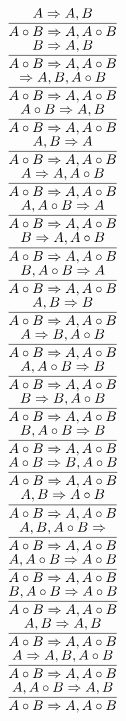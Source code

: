 \documentclass[11pt]{article}
\begin{document}
\begin{center}
\bigskip
\\$\infer{A\circ B\Rightarrow A, A\circ B}{A\Rightarrow A, B}$
\bigskip
\\$\infer{A\circ B\Rightarrow A, A\circ B}{B\Rightarrow A, B}$
\bigskip
\\$\infer{A\circ B\Rightarrow A, A\circ B}{\Rightarrow A, B, A\circ B}$
\bigskip
\\$\infer{A\circ B\Rightarrow A, A\circ B}{A\circ B\Rightarrow A, B}$
\bigskip
\\$\infer{A\circ B\Rightarrow A, A\circ B}{A, B\Rightarrow A}$
\bigskip
\\$\infer{A\circ B\Rightarrow A, A\circ B}{A\Rightarrow A, A\circ B}$
\bigskip
\\$\infer{A\circ B\Rightarrow A, A\circ B}{A, A\circ B\Rightarrow A}$
\bigskip
\\$\infer{A\circ B\Rightarrow A, A\circ B}{B\Rightarrow A, A\circ B}$
\bigskip
\\$\infer{A\circ B\Rightarrow A, A\circ B}{B, A\circ B\Rightarrow A}$
\bigskip
\\$\infer{A\circ B\Rightarrow A, A\circ B}{A, B\Rightarrow B}$
\bigskip
\\$\infer{A\circ B\Rightarrow A, A\circ B}{A\Rightarrow B, A\circ B}$
\bigskip
\\$\infer{A\circ B\Rightarrow A, A\circ B}{A, A\circ B\Rightarrow B}$
\bigskip
\\$\infer{A\circ B\Rightarrow A, A\circ B}{B\Rightarrow B, A\circ B}$
\bigskip
\\$\infer{A\circ B\Rightarrow A, A\circ B}{B, A\circ B\Rightarrow B}$
\bigskip
\\$\infer{A\circ B\Rightarrow A, A\circ B}{A\circ B\Rightarrow B, A\circ B}$
\bigskip
\\$\infer{A\circ B\Rightarrow A, A\circ B}{A, B\Rightarrow A\circ B}$
\bigskip
\\$\infer{A\circ B\Rightarrow A, A\circ B}{A, B, A\circ B\Rightarrow }$
\bigskip
\\$\infer{A\circ B\Rightarrow A, A\circ B}{A, A\circ B\Rightarrow A\circ B}$
\bigskip
\\$\infer{A\circ B\Rightarrow A, A\circ B}{B, A\circ B\Rightarrow A\circ B}$
\bigskip
\\$\infer{A\circ B\Rightarrow A, A\circ B}{A, B\Rightarrow A, B}$
\bigskip
\\$\infer{A\circ B\Rightarrow A, A\circ B}{A\Rightarrow A, B, A\circ B}$
\bigskip
\\$\infer{A\circ B\Rightarrow A, A\circ B}{A, A\circ B\Rightarrow A, B}$

\end{center}
\end{document}
